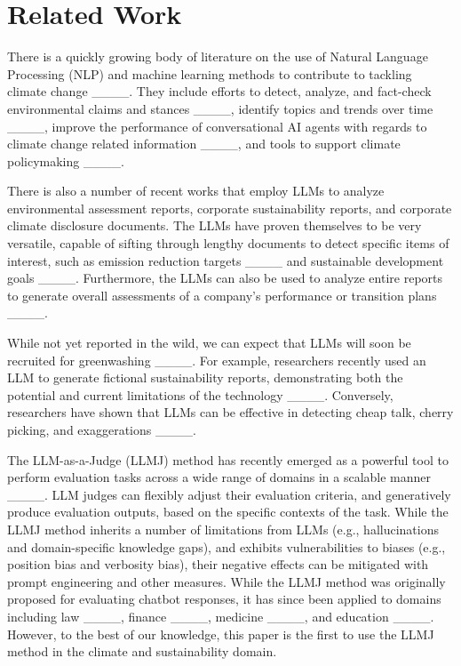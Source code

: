 \section{Related Work}
There is a quickly growing body of literature on the use of Natural Language Processing (NLP) and machine learning methods to contribute to tackling climate change ____. They include efforts to detect, analyze, and fact-check environmental claims and stances ____, identify topics and trends over time ____, improve the performance of conversational AI agents with regards to climate change related information ____, and tools to support climate policymaking ____.

There is also a number of recent works that employ LLMs to analyze environmental assessment reports, corporate sustainability reports, and corporate climate disclosure documents. The LLMs have proven themselves to be very versatile, capable of sifting through lengthy documents to detect specific items of interest, such as emission reduction targets ____ and sustainable development goals ____. Furthermore, the LLMs can also be used to analyze entire reports to generate overall assessments of a company’s performance or transition plans ____.

While not yet reported in the wild, we can expect that LLMs will soon be recruited for greenwashing ____. For example, researchers recently used an LLM to generate fictional sustainability reports, demonstrating both the potential and current limitations of the technology ____. Conversely, researchers have shown that LLMs can be effective in detecting cheap talk, cherry picking, and exaggerations ____. 

The LLM-as-a-Judge (LLMJ) method has recently emerged as a powerful tool to perform evaluation tasks across a wide range of domains in a scalable manner ____. LLM judges can flexibly adjust their evaluation criteria, and generatively produce evaluation outputs, based on the specific contexts of the task. While the LLMJ method inherits a number of limitations from LLMs (e.g., hallucinations and domain-specific knowledge gaps), and exhibits vulnerabilities to biases (e.g., position bias and verbosity bias), their negative effects can be mitigated with prompt engineering and other measures. While the LLMJ method was originally proposed for evaluating chatbot responses, it has since been applied to domains including law ____, finance ____, medicine ____, and education ____. However, to the best of our knowledge, this paper is the first to use the LLMJ method in the climate and sustainability domain.